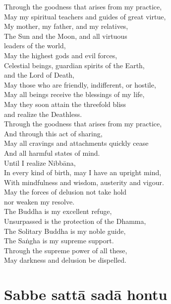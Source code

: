 Through the goodness that arises from my practice,\\
May my spiritual teachers and guides of great virtue,\\
My mother, my father, and my relatives,\\
The Sun and the Moon, and all virtuous\\\vin leaders of the world,\\
May the highest gods and evil forces,\\
Celestial beings, guardian spirits of the Earth,\\\vin and the Lord of Death,\\
May those who are friendly, indifferent, or hostile,\\
May all beings receive the blessings of my life,\\
May they soon attain the threefold bliss\\\vin and realize the Deathless.\\
Through the goodness that arises from my practice,\\
And through this act of sharing,\\
May all cravings and attachments quickly cease\\
And all harmful states of mind.\\
Until I realize Nibbāna,\\
In every kind of birth, may I have an upright mind,\\
With mindfulness and wisdom, austerity and vigour.\\
May the forces of delusion not take hold\\\vin nor weaken my resolve.\\
The Buddha is my excellent refuge,\\
Unsurpassed is the protection of the Dhamma,\\
The Solitary Buddha is my noble guide,\\
The Saṅgha is my supreme support.\\
Through the supreme power of all these,\\
May darkness and delusion be dispelled.\\

\section{Sabbe sattā sadā hontu}

